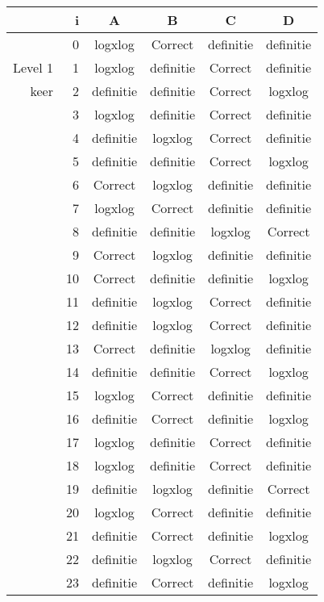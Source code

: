 \begin{tabular}{ rr| c|c|c|c}\hline\hline
     & i & \textbf{A} & \textbf{B} & \textbf{C} & \textbf{D}\\\hline

&0&logxlog&Correct\cellcolor[gray]{0.6}&definitie&definitie\\
Level 1 & 1&logxlog&definitie&Correct\cellcolor[gray]{0.6}&definitie\\
keer &2&definitie&definitie&Correct\cellcolor[gray]{0.6}&logxlog\\
&3&logxlog&definitie&Correct\cellcolor[gray]{0.6}&definitie\\
&4&definitie&logxlog&Correct\cellcolor[gray]{0.6}&definitie\\
&5&definitie&definitie&Correct\cellcolor[gray]{0.6}&logxlog\\
&6&Correct\cellcolor[gray]{0.6}&logxlog&definitie&definitie\\
&7&logxlog&Correct\cellcolor[gray]{0.6}&definitie&definitie\\
&8&definitie&definitie&logxlog&Correct\cellcolor[gray]{0.6}\\
&9&Correct\cellcolor[gray]{0.6}&logxlog&definitie&definitie\\
&10&Correct\cellcolor[gray]{0.6}&definitie&definitie&logxlog\\
&11&definitie&logxlog&Correct\cellcolor[gray]{0.6}&definitie\\
&12&definitie&logxlog&Correct\cellcolor[gray]{0.6}&definitie\\
&13&Correct\cellcolor[gray]{0.6}&definitie&logxlog&definitie\\
&14&definitie&definitie&Correct\cellcolor[gray]{0.6}&logxlog\\
&15&logxlog&Correct\cellcolor[gray]{0.6}&definitie&definitie\\
&16&definitie&Correct\cellcolor[gray]{0.6}&definitie&logxlog\\
&17&logxlog&definitie&Correct\cellcolor[gray]{0.6}&definitie\\
&18&logxlog&definitie&Correct\cellcolor[gray]{0.6}&definitie\\
&19&definitie&logxlog&definitie&Correct\cellcolor[gray]{0.6}\\
&20&logxlog&Correct\cellcolor[gray]{0.6}&definitie&definitie\\
&21&definitie&Correct\cellcolor[gray]{0.6}&definitie&logxlog\\
&22&definitie&logxlog&Correct\cellcolor[gray]{0.6}&definitie\\
&23&definitie&Correct\cellcolor[gray]{0.6}&definitie&logxlog\\
\hline\end{tabular}\par\ \newline

